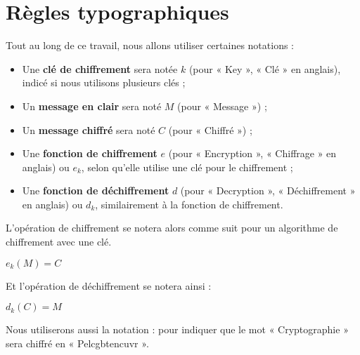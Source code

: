 \section{Règles typographiques}
Tout au long de ce travail, nous allons utiliser certaines notations : 
\begin{itemize}
\item Une \textbf{clé de chiffrement} sera notée $k$ (pour «  Key  »,
  «  Clé  » en anglais), indicé si nous utilisons plusieurs clés ;
  \item Un \textbf{message en clair} sera noté $M$ (pour «  Message  ») ;
  \item Un \textbf{message chiffré} sera noté $C$ (pour «  Chiffré  ») ;
  \item Une \textbf{fonction de chiffrement} $e$ (pour « Encryption
    », «  Chiffrage  » en anglais) ou $e_k$, selon qu'elle utilise
    une clé pour le chiffrement ;
  \item Une \textbf{fonction de déchiffrement} $d$ (pour
    « Decryption », « Déchiffrement  » en anglais) ou $d_k$,
    similairement à la fonction de chiffrement.
\end{itemize}
L'opération de chiffrement se notera alors comme suit pour un
algorithme de chiffrement avec une clé.
\begin{center}
  \begin{math}
    e_k(M) = C
  \end{math}
\end{center}
Et l'opération de déchiffrement se notera ainsi :
\begin{center}
  \begin{math}
    d_k(C) = M
  \end{math}
\end{center}
Nous utiliserons aussi la notation : 
pour indiquer que le mot « Cryptographie » sera chiffré en
 « Pelcgbtencuvr ». 
  
